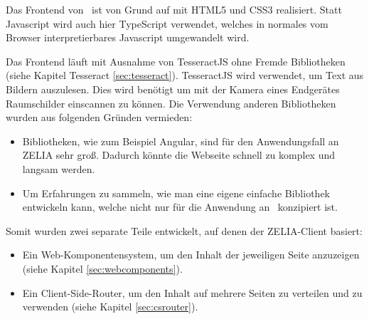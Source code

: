 Das Frontend von \ZELIA\ ist von Grund auf mit HTML5 und CSS3 realisiert. Statt Javascript wird auch hier TypeScript verwendet, welches in normales vom Browser interpretierbares Javascript umgewandelt wird. 

Das Frontend läuft mit Ausnahme von TesseractJS ohne Fremde Bibliotheken (siehe Kapitel Tesseract \ref{sec:tesseract}). TesseractJS wird verwendet, um Text aus Bildern auszulesen. Dies wird benötigt um mit der Kamera eines Endgerätes Raumschilder einscannen zu können. Die Verwendung anderen Bibliotheken wurden aus folgenden Gründen vermieden:
\begin{itemize}
    \item Bibliotheken, wie zum Beispiel Angular, sind für den Anwendungsfall an ZELIA sehr groß. Dadurch könnte die Webseite schnell zu komplex und langsam werden.
    \item Um Erfahrungen zu sammeln, wie man eine eigene einfache Bibliothek entwickeln kann, welche nicht nur für die Anwendung an \ZELIA\ konzipiert ist.
\end{itemize}

Somit wurden zwei separate Teile entwickelt, auf denen der ZELIA-Client basiert:

\begin{itemize}
    \item Ein Web-Komponentensystem, um den Inhalt der jeweiligen Seite anzuzeigen (siehe Kapitel \ref{sec:webcomponents}).
    \item Ein Client-Side-Router, um den Inhalt auf mehrere Seiten zu verteilen und zu verwenden (siehe Kapitel \ref{sec:csrouter}).
\end{itemize}
